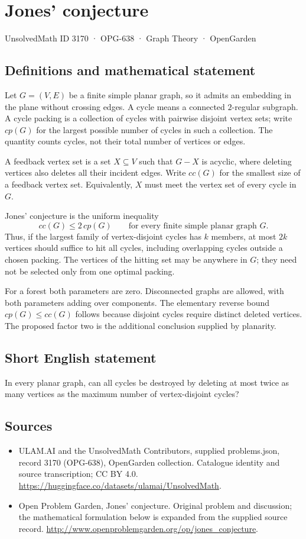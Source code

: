 \documentclass[11pt,a4paper]{article}
\begin{document}
\section*{Jones' conjecture}\label{3170}
{\small UnsolvedMath ID 3170 · OPG-638 · Graph Theory · OpenGarden}
\subsection{Definitions and mathematical statement}
Let $G=(V,E)$ be a finite simple planar graph, so it admits
an embedding in the plane without crossing edges. A cycle
means a connected $2$-regular subgraph. A cycle packing is
a collection of cycles with pairwise disjoint vertex sets;
write $cp(G)$ for the largest possible number of cycles in
such a collection. The quantity counts cycles, not their
total number of vertices or edges.

A feedback vertex set is a set $X\subseteq V$ such that
$G-X$ is acyclic, where deleting vertices also deletes all
their incident edges. Write $cc(G)$ for the smallest size
of a feedback vertex set. Equivalently, $X$ must meet the
vertex set of every cycle in $G$.

Jones' conjecture is the uniform inequality
\[
 cc(G)\leq2\,cp(G)
 \qquad\text{for every finite simple planar graph }G.
\]
Thus, if the largest family of vertex-disjoint cycles has
$k$ members, at most $2k$ vertices should suffice to hit all
cycles, including overlapping cycles outside a chosen packing.
The vertices of the hitting set may be anywhere in $G$;
they need not be selected only from one optimal packing.

For a forest both parameters are zero. Disconnected graphs
are allowed, with both parameters adding over components.
The elementary reverse bound $cp(G)\leq cc(G)$ follows
because disjoint cycles require distinct deleted vertices.
The proposed factor two is the additional conclusion
supplied by planarity.
\subsection{Short English statement}
In every planar graph, can all cycles be destroyed by deleting at most twice as many vertices as the maximum number of vertex-disjoint cycles?
\subsection{Sources}
\begin{itemize}
\item[S1] ULAM.AI and the UnsolvedMath Contributors, supplied problems.json, record 3170 (OPG-638), OpenGarden collection. Catalogue identity and source transcription; CC BY 4.0.
\url{https://huggingface.co/datasets/ulamai/UnsolvedMath}.
\item[S2] Open Problem Garden, Jones' conjecture. Original problem and discussion; the mathematical formulation below is expanded from the supplied source record.
\url{http://www.openproblemgarden.org/op/jones_conjecture}.
\end{itemize}
\end{document}
